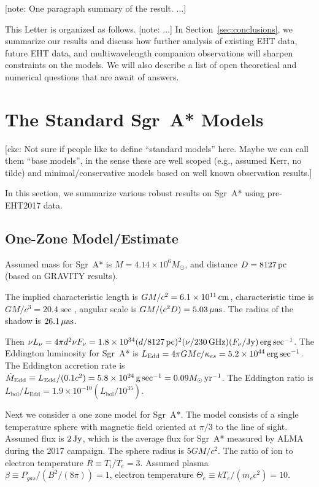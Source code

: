 \documentclass[twocolumn,tighten,dvipsnames]{aastex63}
\newcommand\sgra{Sgr~A*\xspace}
\newcommand\mbh{{M}} %
\newcommand\msun{{M_\odot}}
\newcommand\yr{{\rm \, yr}}
\newcommand\erg{{\rm \, erg}}
\newcommand\Jy{{\rm \, Jy}}
\newcommand\cm{{\rm \, cm}}
\newcommand\pc{{\rm \, pc}}
\newcommand\gm{{\rm \, g}}
\newcommand\uas{{\rm \, \mu as}}
\newcommand\GHz{{\rm \, GHz}}
\newcommand\<{{\langle}}
\renewcommand\>{{\rangle}} %
\newcommand\note[1]{{\color{OliveGreen}[note: #1]}}
\newcommand\ckc[1]{{\color{MidnightBlue}[ckc: #1]}}
\begin{document}
\note{One paragraph summary of the result.  ...}

This Letter is organized as follows.
\note{...}
In Section~\ref{sec:conclusions}, we summarize our results and discuss
how further analysis of existing EHT data, future EHT data, and
multiwavelength companion observations will sharpen constraints on the
models.
We will also describe a list of open theoretical and numerical
questions that are await of answers.

\section{The Standard \sgra Models}
\label{sec:basemodels}

\ckc{Not sure if people like to define ``standard models'' here.
  Maybe we can call them ``base models'', in the sense these are well
  scoped (e.g., assumed Kerr, no tilde) and minimal/conservative
  models based on well known observation results.}

In this section, we summarize various robust results on \sgra using
pre-EHT2017 data.

\subsection{One-Zone Model/Estimate}

Assumed mass for \sgra is
$\mbh = 4.14 \times 10^6 \msun$,
and distance
$D = 8127\pc$
(based on GRAVITY results).

The implied characteristic length is
$G\mbh/c^2 = 6.1 \times 10^{11}\cm$,
characteristic time is
$G\mbh/c^3 = 20.4 \sec$,
angular scale is
$G\mbh/(c^2 D) = 5.03\uas$.
The radius of the shadow is $26.1\uas$.

Then
$\nu L_\nu = 4 \pi d^2 \nu F_\nu = 1.8 \times 10^{34} (d/8127 \pc)^2 (\nu/230 \GHz)(F_\nu/{\rm Jy}) \erg \sec^{-1}$.
The Eddington luminosity for \sgra is
$L_\mathrm{Edd} = 4\pi G\mbh c/\kappa_{es} = 5.2 \times 10^{44} \erg\sec^{-1}$.
The Eddington accretion rate is
$\dot\mbh_\mathrm{Edd} \equiv L_\mathrm{Edd}/(0.1 c^2) = 5.8 \times 10^{24} \gm \sec^{-1} = 0.09 \msun \yr^{-1}$.
The Eddington ratio is
$L_\mathrm{bol}/L_\mathrm{Edd} = 1.9 \times 10^{-10} (L_\mathrm{bol}/10^{35})$.

Next we consider a one zone model for \sgra.
The model consists of a single temperature sphere with magnetic field
oriented at $\pi/3$ to the line of sight.
Assumed flux is $2\Jy$, which is the average flux for \sgra measured
by ALMA during the 2017 campaign.
The sphere radius is
$5 G\mbh/c^2$.
The ratio of ion to electron temperature
$R \equiv T_i/T_e = 3$.
Assumed plasma
$\beta \equiv P_{gas}/(B^2/(8\pi)) = 1$,
electron temperature
$\Theta_e \equiv k T_e/(m_e c^2) = 10$.
\end{document}
